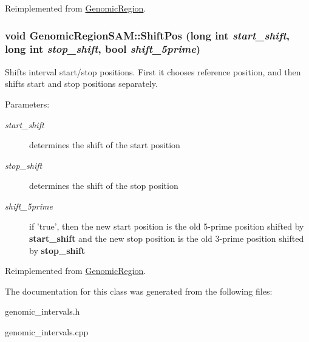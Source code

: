Reimplemented from \hyperlink{classGenomicRegion_0721b07af0850057e4ab9cd416ecac2f}{GenomicRegion}.\hypertarget{classGenomicRegionSAM_c6c559782775bfc65907801148226590}{
\subsubsection[ShiftPos]{\setlength{\rightskip}{0pt plus 5cm}void GenomicRegionSAM::ShiftPos (long int {\em start\_\-shift}, \/  long int {\em stop\_\-shift}, \/  bool {\em shift\_\-5prime})}}
\label{classGenomicRegionSAM_c6c559782775bfc65907801148226590}


Shifts interval start/stop positions. First it chooses reference position, and then shifts start and stop positions separately. 

\begin{Desc}
\item[Parameters:]
\begin{description}
\item[{\em start\_\-shift}]determines the shift of the start position \item[{\em stop\_\-shift}]determines the shift of the stop position \item[{\em shift\_\-5prime}]if 'true', then the new start position is the old 5-prime position shifted by {\bf start\_\-shift} and the new stop position is the old 3-prime position shifted by {\bf stop\_\-shift} \end{description}
\end{Desc}


Reimplemented from \hyperlink{classGenomicRegion_dc42fea61283fa8134d65467b2292405}{GenomicRegion}.

The documentation for this class was generated from the following files:\begin{CompactItemize}
\item 
genomic\_\-intervals.h\item 
genomic\_\-intervals.cpp\end{CompactItemize}

